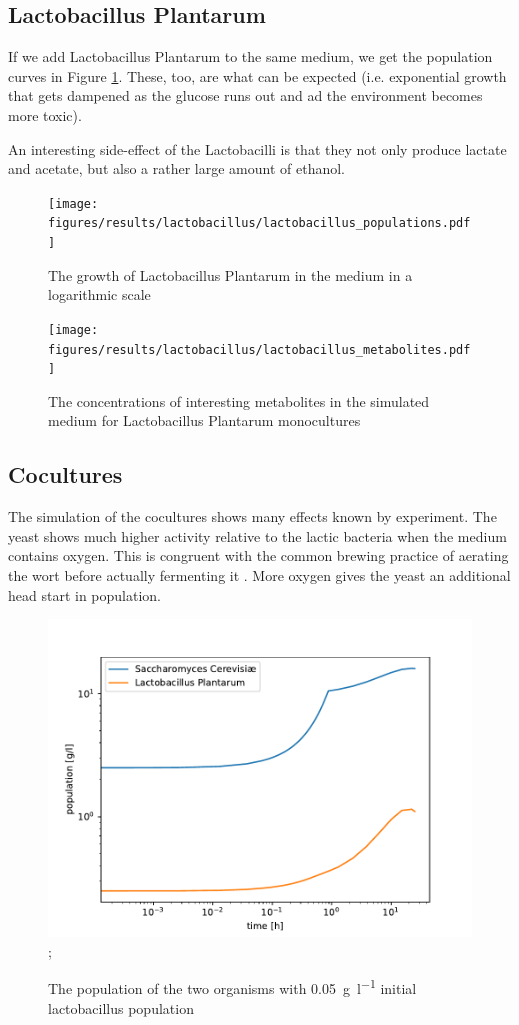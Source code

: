 	\subsection{Lactobacillus Plantarum}
		If we add Lactobacillus Plantarum to the same medium, we get the population curves in Figure \ref{fig:lb_pop}.
		These, too, are what can be expected (i.e. exponential growth that gets dampened as the glucose runs out and ad the environment becomes more toxic).
		
		An interesting side-effect of the Lactobacilli is that they not only produce lactate and acetate, but also a rather large amount of ethanol.
		\begin{figure}[h]
			\centering
			\texttt{[image: figures/results/lactobacillus/lactobacillus\_populations.pdf]}
			\caption{The growth of Lactobacillus Plantarum in the medium in a logarithmic scale}
			\label{fig:lb_pop}
		\end{figure}
		
		\begin{figure}[h]
			\centering
			\texttt{[image: figures/results/lactobacillus/lactobacillus\_metabolites.pdf]}
			\caption{The concentrations of interesting metabolites in the simulated medium for Lactobacillus Plantarum monocultures}
			\label{fig:lb_met}
		\end{figure}
	
	\subsection{Cocultures}
		The simulation of the cocultures shows many effects known by experiment.
		The yeast shows much higher activity relative to the lactic bacteria when the medium contains oxygen.
		This is congruent with the common brewing practice of aerating the wort before actually fermenting it \cite[P. 168]{daniels1996designing}.
		More oxygen gives the yeast an additional head start in population.
		
		\begin{figure}[h]
			\includegraphics[width=\linewidth]{figures/results/cocultures/0.1_populations.pdf};
			\caption{The population of the two organisms with \SI{0.05}{\gram\per\litre} initial lactobacillus population}
			\label{fig:cocult_0.1_pop}
		\end{figure}
		
